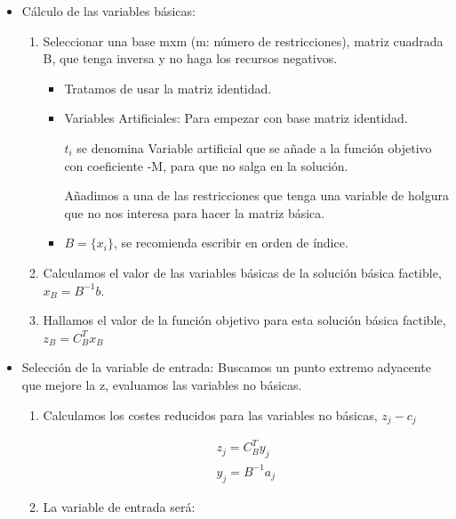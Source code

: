 \documentclass[12pt, twoside, openright]{report} %
\begin{document}
    \begin{itemize}
  
    \item
      Cálculo de las variables básicas:

      \begin{enumerate}
      \def\labelenumi{\arabic{enumi}.}
    
      \item
        Seleccionar una base mxm (m: número de restricciones), matriz
        cuadrada B, que tenga inversa y no haga los recursos negativos.

        \begin{itemize}
      
        \item
          Tratamos de usar la matriz identidad.
        \item
          Variables Artificiales: Para empezar con base matriz
          identidad.

			\(t_i\) se denomina Variable artificial que se añade a la
            función objetivo con coeficiente -M, para que no salga en la
            solución.

			Añadimos a una de las restricciones que tenga una variable
            de holgura que no nos interesa para hacer la matriz básica.

			\item
          \(B = \{ x_i \}\), se recomienda escribir en orden de índice.
        \end{itemize}
      \item
        Calculamos el valor de las variables básicas de la solución
        básica factible, \(x_B=B^{-1}b\).
      \item
        Hallamos el valor de la función objetivo para esta solución
        básica factible, \(z_B=C_B^Tx_B\)
      \end{enumerate}
    \item
      Selección de la variable de entrada: Buscamos un punto extremo
      adyacente que mejore la z, evaluamos las variables no básicas.

      \begin{enumerate}
      \def\labelenumi{\arabic{enumi}.}
    
      \item
        Calculamos los costes reducidos para las variables no básicas,
        \(z_j-c_j\)

        $$\begin{matrix}
			z_j=C_B^Ty_j\\ 
			y_j=B^{-1}a_j
		\end{matrix}$$
      \item
        La variable de entrada será:


\end{enumerate}
\end{itemize}
\end{document}
